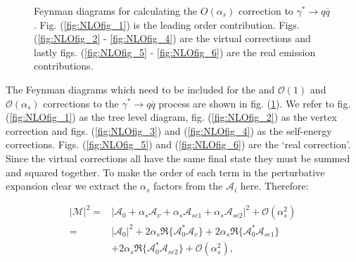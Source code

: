\begin{figure}[tpb]
			\caption{Feynman diagrams for calculating the $O(\alpha_s)$ correction to $\gamma^*\rightarrow q\overline{q}$.
			Fig. (\ref{fig:NLOfig_1}) is the leading order contribution.  Figs. (\ref{fig:NLOfig_2} - \ref{fig:NLOfig_4})
			are the virtual corrections and lastly figs. (\ref{fig:NLOfig_5} - \ref{fig:NLOfig_6}) are the real emission
			contributions.}
			\label{fig:NLOContributions}

		\end{figure}

		The Feynman diagrams which need to be included for the and $\mathcal{O}(1)$ and $\mathcal{O}(\alpha_s)$ corrections to the
		$\gamma^*\rightarrow q\overline{q}$ process are shown in fig. (\ref{fig:NLOContributions}).  We refer to fig. (\ref{fig:NLOfig_1}) as the tree level diagram,
		fig. (\ref{fig:NLOfig_2}) as the vertex correction and figs. (\ref{fig:NLOfig_3}) and (\ref{fig:NLOfig_4}) as the self-energy corrections.
		Figs. (\ref{fig:NLOfig_5}) and (\ref{fig:NLOfig_6}) are the `real correction'.  Since the virtual corrections all have the same final state
		they must be summed and squared together.  To make the order of each term in the perturbative expansion clear we extract the $\alpha_s$
		factors from the $\mathcal{A}_i$ here.  Therefore:

		\begin{equation}
		\begin{split}
			|\mathcal{M}|^2 = &|\mathcal{A}_0 + \alpha_s\mathcal{A}_v + \alpha_s\mathcal{A}_{se1} + \alpha_s\mathcal{A}_{se2}|^2 + \mathcal{O}(\alpha_s^2) \\
			                = &|\mathcal{A}_0|^2 + 2\alpha_s\Re\{\mathcal{A}^*_0\mathcal{A}_v\} + 2\alpha_s\Re\{\mathcal{A}^*_0\mathcal{A}_{se1}\} \\
			                  & + 2\alpha_s\Re\{\mathcal{A}^*_0\mathcal{A}_{se2}\} + \mathcal{O}(\alpha_s^2),
			\label{eqn:MEBreakdown}
		\end{split}
		\end{equation}

